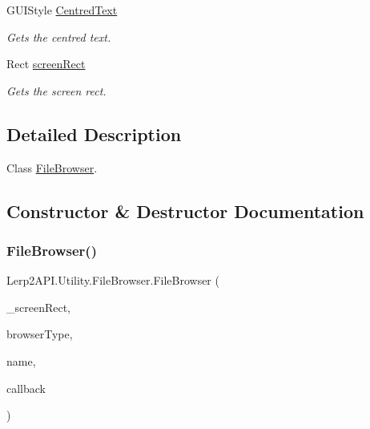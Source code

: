 \begin{DoxyCompactItemize}
G\+U\+I\+Style \hyperlink{class_lerp2_a_p_i_1_1_utility_1_1_file_browser_ad206161de3d10e4df0b00c051a4916a3}{Centred\+Text}
\begin{DoxyCompactList}\small\item\em Gets the centred text. \end{DoxyCompactList}\item 
Rect \hyperlink{class_lerp2_a_p_i_1_1_utility_1_1_file_browser_a7aca10f30a0eb27e99843f92b5de6be1}{screen\+Rect}
\begin{DoxyCompactList}\small\item\em Gets the screen rect. \end{DoxyCompactList}\end{DoxyCompactItemize}


\subsection{Detailed Description}
Class \hyperlink{class_lerp2_a_p_i_1_1_utility_1_1_file_browser}{File\+Browser}. 



\subsection{Constructor \& Destructor Documentation}
\mbox{\label{class_lerp2_a_p_i_1_1_utility_1_1_file_browser_a05a3b77b7e05d43111821ae8524c0260}} 
\subsubsection{\texorpdfstring{File\+Browser()}{FileBrowser()}}
{\footnotesize\ttfamily Lerp2\+A\+P\+I.\+Utility.\+File\+Browser.\+File\+Browser (\begin{DoxyParamCaption}\item[{Rect}]{\+\_\+screen\+Rect,  }\item[{\hyperlink{namespace_lerp2_a_p_i_1_1_utility_af5d628470963cc0f18c37055b4170bf1}{File\+Browser\+Type}}]{browser\+Type,  }\item[{string}]{name,  }\item[{Action$<$ string $>$}]{callback }\end{DoxyParamCaption})\hspace{0.3cm}{\ttfamily [inline]}}



